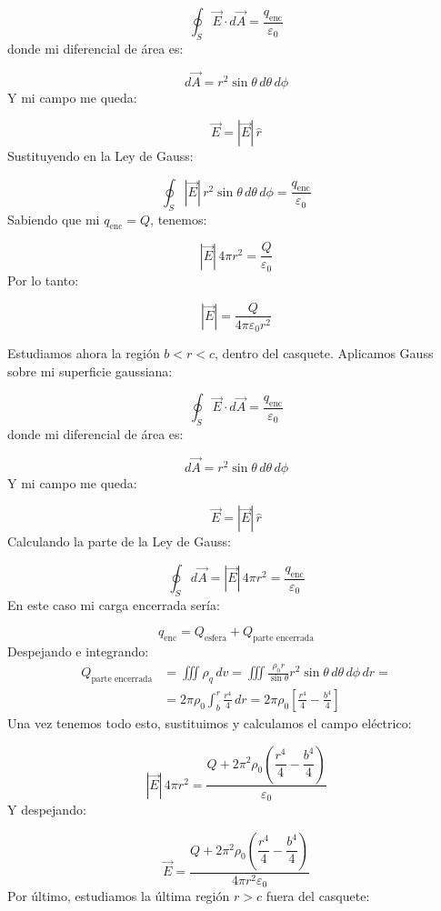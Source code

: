 \documentclass[a4paper,12pt]{article}
\begin{document}
\[
\oint_{S} \vec{E} \cdot d\vec{A} = \frac{q_{\text{enc}}}{\varepsilon_0}
\]
donde mi diferencial de área es:

\[
d\vec{A} = r^2 \sin\theta\, d\theta\, d\phi
\]
Y mi campo me queda:

\[
\vec{E} = |\vec{E}|\, \hat{r}
\]
Sustituyendo en la Ley de Gauss:

\[
\oint_{S} |\vec{E}|\, r^2 \sin\theta\, d\theta\, d\phi = \frac{q_{\text{enc}}}{\varepsilon_0}
\]
Sabiendo que mi $q_{\text{enc}} = Q$, tenemos:

\[
|\vec{E}|\, 4\pi r^2 = \frac{Q}{\varepsilon_0}
\]
Por lo tanto:

\[
|\vec{E}| = \frac{Q}{4\pi \varepsilon_0 r^2}
\]

\newpage
\noindent
Estudiamos ahora la región $b < r < c$, dentro del casquete.  
Aplicamos Gauss sobre mi superficie gaussiana:

\[
\oint_{S} \vec{E} \cdot d\vec{A} = \frac{q_{\text{enc}}}{\varepsilon_0}
\]
donde mi diferencial de área es:

\[
d\vec{A} = r^2 \sin\theta\, d\theta\, d\phi
\]
Y mi campo me queda:

\[
\vec{E} = |\vec{E}|\, \hat{r}
\]
Calculando la parte de la Ley de Gauss:

\[
\oint_{S} d\vec{A} = |\vec{E}|\, 4\pi r^2 = \frac{q_{\text{enc}}}{\varepsilon_0}
\]
En este caso mi carga encerrada sería:

\[
q_{\text{enc}} = Q_{\text{esfera}} + Q_{\text{parte encerrada}}
\]
Despejando e integrando:
\[
\begin{aligned}
Q_{\text{parte encerrada}} &= \iiint \rho_q\, dv = \iiint \frac{\rho_0 r}{\sin\theta} r^2 \sin\theta\, d\theta\, d\phi\, dr = \\[6pt]
&= 2\pi \rho_0 \int_{b}^{r} \frac{r^4}{4}\, dr = 2\pi \rho_0 \left[ \frac{r^4}{4} - \frac{b^4}{4} \right]
\end{aligned}
\]
Una vez tenemos todo esto, sustituimos y calculamos el campo eléctrico:

\[
|\vec{E}|\, 4\pi r^2 = \frac{Q + 2\pi^2 \rho_0 \left( \dfrac{r^4}{4} - \dfrac{b^4}{4} \right)}{\varepsilon_0}
\]
Y despejando:

\[
\vec{E} = \frac{Q + 2\pi^2 \rho_0 \left( \dfrac{r^4}{4} - \dfrac{b^4}{4} \right)}{4\pi r^2 \varepsilon_0}
\]
Por último, estudiamos la última región $r > c$ fuera del casquete:
\end{document}
